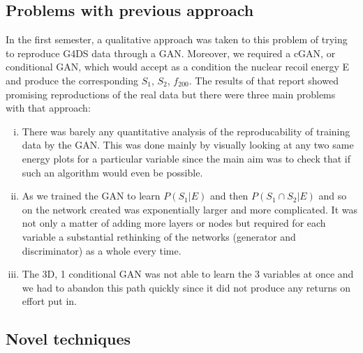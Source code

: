 \documentclass[11pt]{article} %
\begin{document}
\subsection{Problems with previous approach}
In the first semester, a qualitative approach was taken to this problem of trying to reproduce G4DS data through a GAN.
Moreover, we required a cGAN, or conditional GAN, which would accept as a condition the nuclear recoil energy E and produce the corresponding $S_1$, $S_2$, $f_200$.
The results of that report showed promising reproductions of the real data but there were three main problems with that approach:
\begin{enumerate}[i)]
  \item There was barely any quantitative analysis of the reproducability of training data by the GAN.
  This was done mainly by visually looking at any two same energy plots for a particular variable since the main aim was to check that if such an algorithm would even be possible.
  \item As we trained the GAN to learn $P(S_1|E)$ and then $P(S_1 \cap S_2|E)$ and so on the network created was exponentially larger and more complicated.
  It was not only a matter of adding more layers or nodes but required for each variable a substantial rethinking of the networks (generator and discriminator) as a whole every time.
  \item The 3D, 1 conditional GAN was not able to learn the 3 variables at once and we had to abandon this path quickly since it did not produce any returns on effort put in.
\end{enumerate}
\subsection{Novel techniques}
\end{document}
